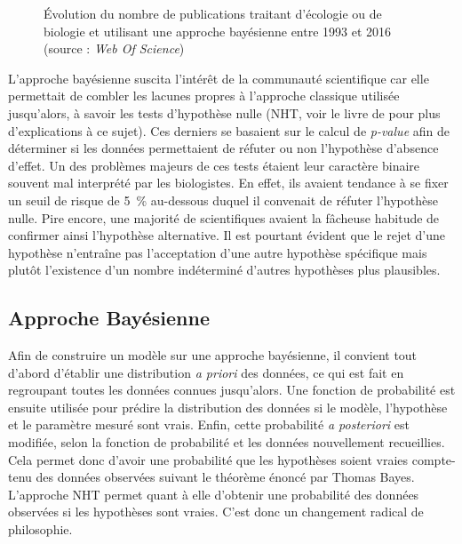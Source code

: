 \begin{figure}[h]
  \centering{\graphfont}
  \caption{Évolution du nombre de publications traitant d'écologie ou de
    biologie et utilisant une approche bayésienne entre 1993 et 2016 (source :
    \textit{Web Of Science})}
  \label{fig:bibliometry}
\end{figure}

L'approche bayésienne suscita l'intérêt de la communauté scientifique car elle
permettait de combler les lacunes propres à l'approche classique utilisée
jusqu'alors, à savoir les tests d'hypothèse nulle (NHT, voir le livre de
\citet{fisher1925} pour plus d'explications à ce sujet).
Ces derniers se basaient sur le calcul de \textit{p-value} afin de déterminer si
les données permettaient de réfuter ou non l'hypothèse d'absence d'effet.
Un des problèmes majeurs de ces tests étaient leur caractère binaire souvent mal
interprété par les biologistes.
En effet, ils avaient tendance à se fixer un seuil de risque de 5~\% au-dessous
duquel il convenait de réfuter l'hypothèse nulle.
Pire encore, une majorité de scientifiques avaient la fâcheuse habitude de
confirmer ainsi l'hypothèse alternative.
Il est pourtant évident que le rejet d'une hypothèse n'entraîne pas
l'acceptation d'une autre hypothèse spécifique mais plutôt l'existence d'un
nombre indéterminé d'autres hypothèses plus plausibles.

\subsection{Approche Bayésienne}

Afin de construire un modèle sur une approche bayésienne, il convient tout
d'abord d'établir une distribution \textit{a priori} des données, ce qui est
fait en regroupant toutes les données connues jusqu'alors.
Une fonction de probabilité est ensuite utilisée pour prédire la distribution
des données si le modèle, l'hypothèse et le paramètre mesuré sont vrais.
Enfin, cette probabilité \textit{a posteriori} est modifiée, selon la fonction
de probabilité et les données nouvellement recueillies.
Cela permet donc d'avoir une probabilité que les hypothèses soient vraies
compte-tenu des données observées suivant le théorème énoncé par Thomas Bayes.
L'approche NHT permet quant à elle d'obtenir une probabilité des données
observées si les hypothèses sont vraies.
C'est donc un changement radical de philosophie.

